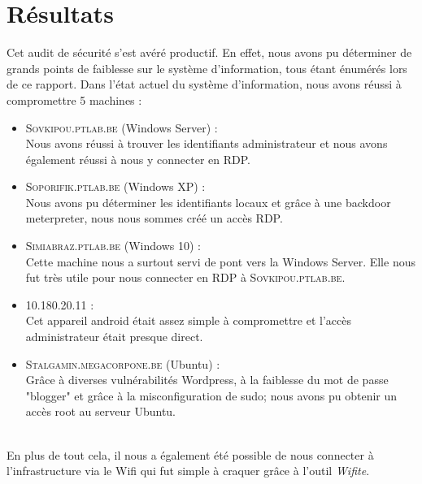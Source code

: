 \documentclass[a4paper]{article}
\begin{document}
\newpage
\section{Résultats}

Cet audit de sécurité s'est avéré productif. En effet, nous avons pu déterminer de grands points de faiblesse sur le système d'information, tous étant énumérés lors de ce rapport. Dans l'état actuel du système d'information, nous avons réussi à compromettre 5 machines :
\begin{itemize}
    \item \textsc{Sovkipou.ptlab.be} (Windows Server) :\\
    Nous avons réussi à trouver les identifiants administrateur et nous avons également réussi à nous y connecter en RDP.
    \item \textsc{Soporifik.ptlab.be} (Windows XP) :\\
    Nous avons pu déterminer les identifiants locaux et grâce à une backdoor meterpreter, nous nous sommes créé un accès RDP.
    \item \textsc{Simiabraz.ptlab.be} (Windows 10) :\\
    Cette machine nous a surtout servi de pont vers la Windows Server. Elle nous fut très utile pour nous connecter en RDP à \textsc{Sovkipou.ptlab.be}.
    \item 10.180.20.11 : \\
    Cet appareil android était assez simple à compromettre et l'accès administrateur était presque direct.
    \item \textsc{Stalgamin.megacorpone.be} (Ubuntu) :\\
    Grâce à diverses vulnérabilités Wordpress, à la faiblesse du mot de passe "blogger" et grâce à la misconfiguration de sudo; nous avons pu obtenir un accès root au serveur Ubuntu.\\\\
\end{itemize}

En plus de tout cela, il nous a également été possible de nous connecter à l'infrastructure via le Wifi qui fut simple à craquer grâce à l'outil \emph{Wifite}.
\end{document}
